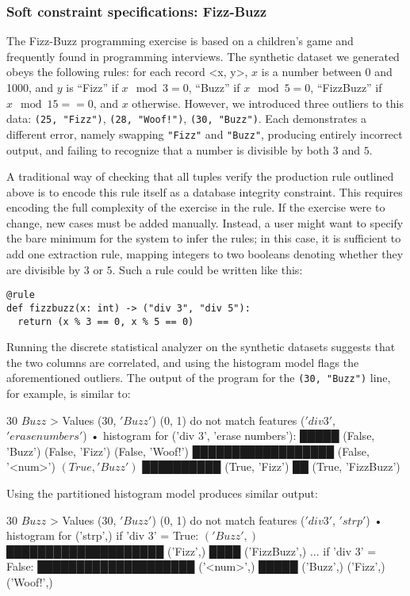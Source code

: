 \subsubsection{Soft constraint specifications: Fizz-Buzz}
The Fizz-Buzz programming exercise is based on a children's game and frequently found in programming interviews. The synthetic dataset we generated obeys the following rules: for each record <x, y>, $x$ is a number between 0 and 1000, and $y$ is ``Fizz'' if \(x \mod 3 = 0\), ``Buzz'' if \(x \mod 5 = 0\), ``FizzBuzz'' if \(x \mod 15 == 0\), and \(x\) otherwise. However, we introduced three outliers to this data: \texttt{(25, "Fizz")}, \texttt{(28, "Woof!")}, \texttt{(30, "Buzz")}. Each demonstrates a different error, namely swapping \texttt{"Fizz"} and \texttt{"Buzz"}, producing entirely incorrect output, and failing to recognize that a number is divisible by both $3$ and $5$.

A traditional way of checking that all tuples verify the production rule outlined above is to encode this rule itself as a database integrity constraint. This requires encoding the full complexity of the exercise in the rule. If the exercise were to change, new cases must be added manually. Instead, a user might want to specify the bare minimum for the system to infer the rules; in this case, it is sufficient to add one extraction rule, mapping integers to two booleans denoting whether they are divisible by $3$ or $5$. Such a rule could be written like this:

\begin{verbatim}
@rule
def fizzbuzz(x: int) -> ("div 3", "div 5"):
  return (x % 3 == 0, x % 5 == 0)
\end{verbatim}

Running the discrete statistical analyzer on the synthetic datasets suggests that the two columns are correlated, and using the histogram model flags the aforementioned outliers. The output of the program for the \texttt{(30, "Buzz")} line, for example, is similar to:

\begin{lstnobreak}[gobble=2]
   $30$ $Buzz$
   > Values ($30$, $'Buzz'$) (0, 1) do not match
     features ($'div 3'$, $'erase numbers'$)
     • histogram for ('div 3', 'erase numbers'):
       █████ (False, 'Buzz')
       (False, 'Fizz')
       (False, 'Woof!')
       ██████████████████ (False, '<num>')
       $(True, 'Buzz')$
       ██████████ (True, 'Fizz')
       ██ (True, 'FizzBuzz')
\end{lstnobreak}

Using the partitioned histogram model produces similar output:

\begin{lstnobreak}[gobble=2]
   $30$ $Buzz$
   > Values ($30$, $'Buzz'$) (0, 1) do not match
     features ($'div 3'$, $'strp'$)
     • histogram for ('strp',) if 'div 3' = True:
       $('Buzz',)$
       ████████████████████ ('Fizz',)
       ████ ('FizzBuzz',)
     ... if 'div 3' = False:
       ████████████████████ ('<num>',)
       █████ ('Buzz',)
       ('Fizz',)
       ('Woof!',)
\end{lstnobreak}
